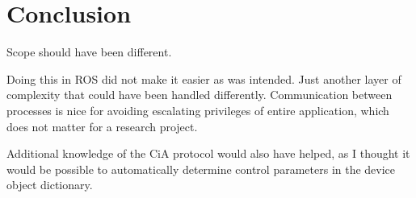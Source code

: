 \section{Conclusion}

Scope should have been different.

Doing this in ROS did not make it easier as was intended. 
Just another layer of complexity that could have been handled differently.
Communication between processes is nice for avoiding escalating privileges of entire application, which does not matter for a research project. 

Additional knowledge of the CiA protocol would also have helped, as I thought it would be possible to automatically determine control parameters in the device object dictionary.
